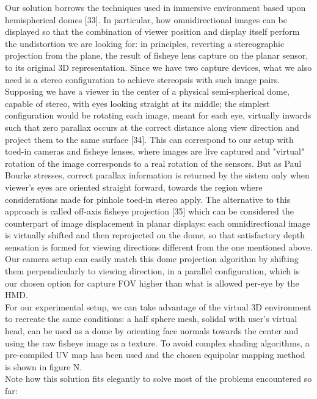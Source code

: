 Our solution borrows the techniques used in immersive environment based upon hemispherical domes [33]. In particular, how omnidirectional images can be displayed so that the combination of viewer position and display itself perform the undistortion we are looking for: in principles, reverting a stereographic projection from the plane, the result of fisheye lens capture on the planar sensor, to its original 3D representation. Since we have two capture devices, what we also need is a stereo configuration to achieve stereopsis with such image pairs. Supposing we have a viewer in the center of a physical semi-spherical dome, capable of stereo, with eyes looking straight at its middle; the simplest configuration would be rotating each image, meant for each eye,  virtually inwards such that zero parallax occurs at the correct distance along view direction and project them to the same surface [34]. This can correspond to our setup with toed-in cameras and fisheye lenses, where images are live captured and "virtual" rotation of the image corresponds to a real rotation of the sensors. But as Paul Bourke stresses, correct parallax information is returned by the sistem only when viewer's eyes are oriented straight forward, towards the region where considerations made for pinhole toed-in stereo apply. The alternative to this approach is called off-axis fisheye projection [35] which can be considered the counterpart of image displacement in planar displays: each omnidirectional image is virtually shifted and then reprojected on the dome, so that satisfactory depth sensation is formed for viewing directions different from the one mentioned above. Our camera setup can easily match this dome projection algorithm by shifting them perpendicularly to viewing direction, in a parallel configuration, which is our chosen option for capture FOV higher than what is allowed per-eye by the HMD.\\
For our experimental setup, we can take advantage of the virtual 3D environment to recreate the same conditions: a half sphere mesh, solidal with user's virtual head,  can be used as a dome by orienting face normals towards the center and using the raw fisheye image as a texture. To avoid complex shading algorithms, a pre-compiled UV map has been used and the chosen equipolar mapping method is shown in figure N.\\
Note how this solution fits elegantly to solve most of the problems encountered so far:

